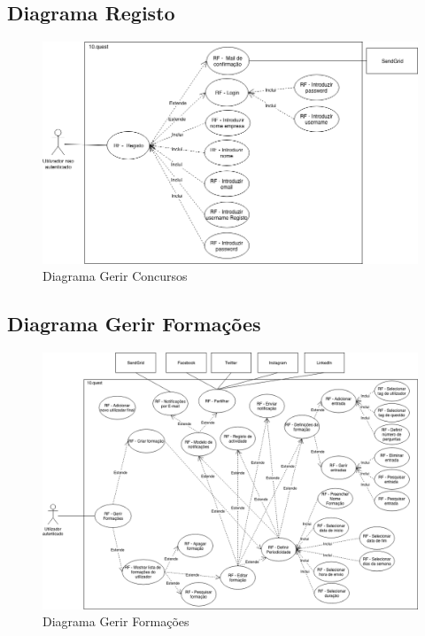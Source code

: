 \newpage

\subsection{Diagrama Registo}
\label{d:registo}
\begin{figure}[ht!]
	\begin{center}
		\includegraphics[width=1\textwidth]{img/rf/registo}
		\caption{Diagrama Gerir Concursos}
		\label{fig:rf-registo}
	\end{center}
\end{figure}

\newpage

\subsection{Diagrama Gerir Formações}
\label{d:formacoes}
\begin{figure}[ht!]
	\begin{center}
		\includegraphics[width=1\textwidth]{img/rf/gerir-formacoes}
		\caption{Diagrama Gerir Formações}
		\label{fig:rf-gerir-formacoes}
	\end{center}
\end{figure}

